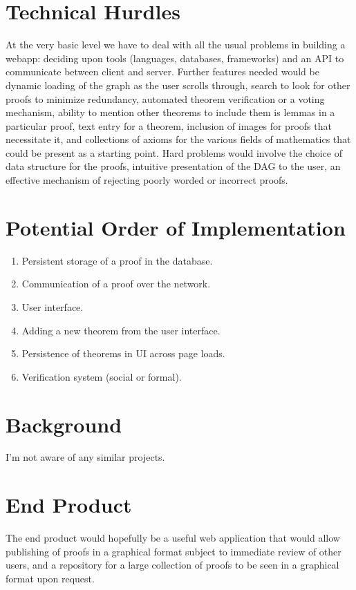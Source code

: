 \documentclass{acm_proc_article-sp}
\begin{document}
\section{Technical Hurdles}
At the very basic level we have to deal with all the usual problems in
building a webapp: deciding upon tools (languages, databases, frameworks)
and an API to communicate between client and server. Further features
needed would be dynamic loading of the graph as the user scrolls through,
search to look for other proofs to minimize redundancy, automated theorem
verification or a voting mechanism, ability to mention other theorems
to include them is lemmas in a particular proof, text entry for a theorem,
inclusion of images for proofs that necessitate it, and collections of
axioms for the various fields of mathematics that could be present as
a starting point. Hard problems would involve the choice of data 
structure for the proofs, intuitive presentation of the DAG to the user,
an effective mechanism of rejecting poorly worded or incorrect proofs.

\section{Potential Order of Implementation}
\begin{enumerate}
    \item Persistent storage of a proof in the database.
    \item Communication of a proof over the network.
    \item User interface.
    \item Adding a new theorem from the user interface.
    \item Persistence of theorems in UI across page loads.
    \item Verification system (social or formal). 
\end{enumerate}

\section{Background}
I'm not aware of any similar projects.
\section{End Product}
The end product would hopefully be a useful web application that would
allow publishing of proofs in a graphical format subject to immediate review
of other users, and a repository for a large collection of proofs to be
seen in a graphical format upon request.
\end{document}
